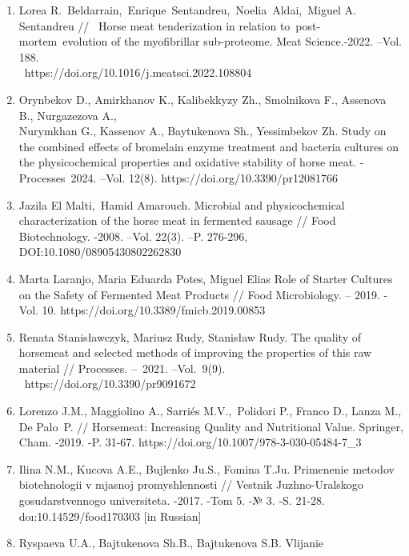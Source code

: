 \begin{noparindent}

\begin{enumerate}
\def\labelenumi{\arabic{enumi}.}
\item
  Lorea R.~Beldarrain,~Enrique~Sentandreu,~Noelia~Aldai,~Miguel A.
  Sentandreu //~ Horse meat tenderization in relation
  to~post-mortem~evolution of the myofibrillar sub-proteome. Meat
  Science.-2022. --Vol.
  188.\\~https://doi.org/10.1016/j.meatsci.2022.108804
\item
  Orynbekov D., Amirkhanov K., Kalibekkyzy Zh., Smolnikova F., Assenova
  B., Nurgazezova A., \\Nurymkhan G., Kassenov A., Baytukenova Sh.,
  Yessimbekov Zh. Study on the combined effects of bromelain enzyme
  treatment and bacteria cultures on the physicochemical properties and
  oxidative stability of horse meat. -Processes\emph{~}2024. --Vol.
  12(8). https://doi.org/10.3390/pr12081766
\item
  Jazila El Malti,~Hamid Amarouch. Microbial and physicochemical
  characterization of the horse meat in fermented sausage // Food
  Biotechnology. -2008. --Vol. 22(3). --P. 276-296, \\DOI:10.1080/08905430802262830
\item
  Marta Laranjo, Maria Eduarda Potes, Miguel Elias Role of Starter
  Cultures on the Safety of Fermented Meat Products // Food
  Microbiology. -- 2019. -Vol. 10. https://doi.org/10.3389/fmicb.2019.00853
\item
  Renata Stanisławczyk, Mariusz Rudy, Stanisław Rudy. The quality of
  horsemeat and selected methods of improving the properties of this raw
  material // Processes. --~2021. --Vol.~9(9).\\ ~https://doi.org/10.3390/pr9091672
\item
  Lorenzo J.M., Maggiolino A., Sarriés M.V.,~Polidori P., Franco D.,
  Lanza M., De Palo~P. // Horsemeat: Increasing Quality and Nutritional
  Value. Springer, Cham. -2019. -P. 31-67.
  https://doi.org/10.1007/978-3-030-05484-7\_3
\item
  Il\textquotesingle ina N.M., Kucova A.E., Bujlenko Ju.S., Fomina T.Ju.
  Primenenie metodov biotehnologii v mjasnoj promyshlennosti // Vestnik
  Juzhno-Ural\textquotesingle skogo gosudarstvennogo universiteta.
  -2017. -Tom 5. -№ 3. -S. 21-28. doı:10.14529/food170303 {[}in
  Russian{]}
\item
  Ryspaeva U.A., Bajtukenova Sh.B., Bajtukenova S.B. Vlijanie

\end{enumerate}
\end{noparindent}
